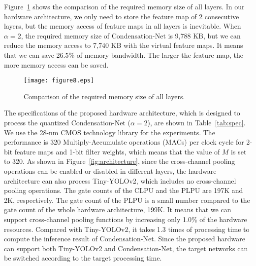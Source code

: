 \documentclass[10pt,twocolumn,letterpaper]{article}
\begin{document}
Figure~\ref{fig:bandwidth} shows the comparison of the required memory size of all layers. In our hardware architecture, we only need to store the feature map of 2 consecutive layers, but the memory access of feature maps in all layers is inevitable. When $\alpha = 2$, the required memory size of Condensation-Net is 9,788 KB, but we can reduce the memory access to 7,740 KB with the virtual feature maps. It means that we can save 26.5\% of memory bandwidth. The larger the feature map, the more memory access can be saved.

\begin{figure}[t]
\begin{center}
\texttt{[image: figure8.eps]}
\end{center}
   \caption{Comparison of the required memory size of all layers.}
\label{fig:bandwidth}
\end{figure}

The specifications of the proposed hardware architecture, which is designed to process the quantized Condensation-Net ($\alpha = 2$), are shown in Table~\ref{tab:spec}. We use the 28-nm CMOS technology library for the experiments. The performance is 320 Multiply-Accumulate operations (MACs) per clock cycle for 2-bit feature maps and 1-bit filter weights, which means that the value of $M$ is set to 320. As shown in Figure~\ref{fig:architecture}, since the cross-channel pooling operations can be enabled or disabled in different layers, the hardware architecture can also process Tiny-YOLOv2, which includes no cross-channel pooling operations. The gate counts of the CLPU and the PLPU are 197K and 2K, respectively. The gate count of the PLPU is a small number compared to the gate count of the whole hardware architecture, 199K. It means that we can support cross-channel pooling functions by increasing only 1.0\% of the hardware resources. Compared with Tiny-YOLOv2, it takes 1.3 times of processing time to compute the inference result of Condensation-Net. Since the proposed hardware can support both Tiny-YOLOv2 and Condensation-Net, the target networks can be switched according to the target processing time.
\end{document}

